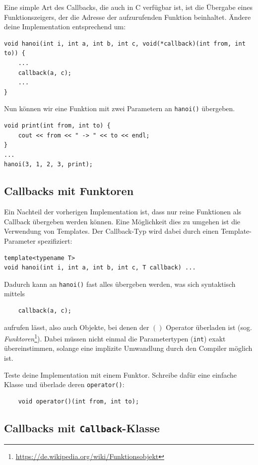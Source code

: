 Eine simple Art des Callbacks, die auch in C verfügbar ist, ist die Übergabe eines Funktionszeigers, der die Adresse der aufzurufenden Funktion beinhaltet.
Ändere deine Implementation entsprechend um:

\begin{lstlisting}
void hanoi(int i, int a, int b, int c, void(*callback)(int from, int to)) {
	...
	callback(a, c);
	...
}
\end{lstlisting}

Nun können wir eine Funktion mit zwei Parametern an \lstinline{hanoi()} übergeben.
\begin{lstlisting}
void print(int from, int to) {
	cout << from << " -> " << to << endl;
}
...
hanoi(3, 1, 2, 3, print);
\end{lstlisting}

\subsection{Callbacks mit Funktoren}
Ein Nachteil der vorherigen Implementation ist, dass nur reine Funktionen als Callback übergeben werden können.
Eine Möglichkeit dies zu umgehen ist die Verwendung von Templates.
Der Callback-Typ wird dabei durch einen Template-Parameter spezifiziert:
\begin{lstlisting}
template<typename T>
void hanoi(int i, int a, int b, int c, T callback) ...
\end{lstlisting}

Dadurch kann an \lstinline{hanoi()} fast alles übergeben werden, was sich syntaktisch mittels
\begin{lstlisting}
	callback(a, c);
\end{lstlisting}
aufrufen lässt, also auch Objekte, bei denen der $()$ Operator überladen ist (sog. \emph{Funktoren}\footnote{\url{https://de.wikipedia.org/wiki/Funktionsobjekt}}).
Dabei müssen nicht einmal die Parametertypen (\lstinline{int}) exakt übereinstimmen, solange eine implizite Umwandlung durch den Compiler möglich ist.

Teste deine Implementation mit einem Funktor.
Schreibe dafür eine einfache Klasse und überlade deren \lstinline{operator()}:
\begin{lstlisting}
	void operator()(int from, int to);
\end{lstlisting}

\subsection{Callbacks mit \lstinline{Callback}-Klasse}

